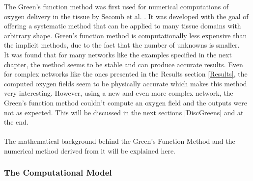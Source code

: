The Green's function method was first used for numerical computations of oxygen delivery in the tissue by Secomb et al. \cite{Secomb2004}. It was developed with the goal of offering a systematic method that can be applied to many tissue domains with arbitrary shape. Green's function method is computationally less expensive than the implicit methods, due to the fact that the number of unknowns is smaller.
\\It was found that for many networks like the examples specified in the next chapter, the method seems to be stable and can produce accurate results. Even for complex networks like the ones presented in the Results section  \ref{Results}, the computed oxygen fields seem to be physically accurate which makes this method very interesting. However, using a new and even more complex network, the Green's function method couldn't compute an oxygen field and the outputs were not as expected. This will be discussed in the next sections \ref{DiscGreens} and at the end.\\
\\The mathematical background behind the Green's Function Method and the numerical method derived from it will be explained here.

\subsubsection{The Computational Model}
\label{CompMod}


